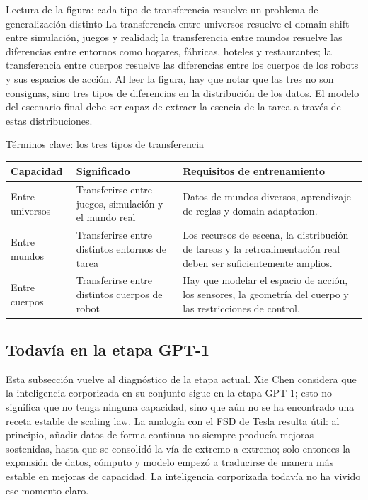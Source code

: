 \documentclass[a4paper]{article}
\begin{document}
\begin{knowledgebox}{Lectura de la figura: cada tipo de transferencia resuelve un problema de generalización distinto}
La transferencia entre universos resuelve el domain shift entre simulación, juegos y realidad; la transferencia entre mundos resuelve las diferencias entre entornos como hogares, fábricas, hoteles y restaurantes; la transferencia entre cuerpos resuelve las diferencias entre los cuerpos de los robots y sus espacios de acción. Al leer la figura, hay que notar que las tres no son consignas, sino tres tipos de diferencias en la distribución de los datos. El modelo del escenario final debe ser capaz de extraer la esencia de la tarea a través de estas distribuciones.
\end{knowledgebox}

\begin{knowledgebox}{Términos clave: los tres tipos de transferencia}
\begin{tabularx}{\textwidth}{p{}p{}X}
\toprule
Capacidad & Significado & Requisitos de entrenamiento \\
\midrule
Entre universos & Transferirse entre juegos, simulación y el mundo real & Datos de mundos diversos, aprendizaje de reglas y domain adaptation. \\
Entre mundos & Transferirse entre distintos entornos de tarea & Los recursos de escena, la distribución de tareas y la retroalimentación real deben ser suficientemente amplios. \\
Entre cuerpos & Transferirse entre distintos cuerpos de robot & Hay que modelar el espacio de acción, los sensores, la geometría del cuerpo y las restricciones de control. \\
\bottomrule
\end{tabularx}
\end{knowledgebox}

\subsection{Todavía en la etapa GPT-1}

Esta subsección vuelve al diagnóstico de la etapa actual. Xie Chen considera que la inteligencia corporizada en su conjunto sigue en la etapa GPT-1; esto no significa que no tenga ninguna capacidad, sino que aún no se ha encontrado una receta estable de scaling law. La analogía con el FSD de Tesla resulta útil: al principio, añadir datos de forma continua no siempre producía mejoras sostenidas, hasta que se consolidó la vía de extremo a extremo; solo entonces la expansión de datos, cómputo y modelo empezó a traducirse de manera más estable en mejoras de capacidad. La inteligencia corporizada todavía no ha vivido ese momento claro.
\end{document}
